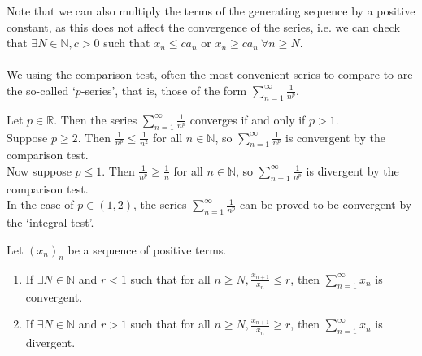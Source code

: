 \documentclass[../real_analysis.tex]{subfiles}
\begin{document}
        Note that we can also multiply the terms of the generating sequence by a positive constant, as this does not affect the convergence of the series, i.e. we can check that $\exists N\in\mathbb{N}, c>0$ such that $x_n\leq ca_n$ or $x_n\geq ca_n\ \forall n\geq N$.

        \paragraph{}
        We using the comparison test, often the most convenient series to compare to are the so-called `$p$-series', that is, those of the form $\sum_{n=1}^\infty\frac{1}{n^p}$.
        \begin{example}
            Let $p\in\mathbb{R}$. Then the series $\sum_{n=1}^\infty\frac{1}{n^p}$ converges if and only if $p>1$.\\
            Suppose $p\geq2$. Then $\frac{1}{n^p}\leq\frac{1}{n^2}$ for all $n\in\mathbb{N}$, so $\sum_{n=1}^\infty\frac{1}{n^p}$ is convergent by the comparison test.\\
            Now suppose $p\leq1$. Then $\frac{1}{n^p}\geq\frac{1}{n}$ for all $n\in\mathbb{N}$, so $\sum_{n=1}^\infty\frac{1}{n^p}$ is divergent by the comparison test.\\
            In the case of $p\in(1, 2)$, the series $\sum_{n=1}^\infty\frac{1}{n^p}$ can be proved to be convergent by the `integral test'.
        \end{example}
        \begin{theorem}
            Let $(x_n)_n$ be a sequence of positive terms.
            \begin{enumerate}[\upshape(i)]
                \item If $\exists N\in\mathbb{N}$ and $r<1$ such that for all $n\geq N, \frac{x_{n+1}}{x_n}\leq r$, then $\sum_{n=1}^\infty x_n$ is convergent.
                \item If $\exists N\in\mathbb{N}$ and $r>1$ such that for all $n\geq N, \frac{x_{n+1}}{x_n}\geq r$, then $\sum_{n=1}^\infty x_n$ is divergent.
                \end{enumerate}
        \end{theorem}
\end{document}
